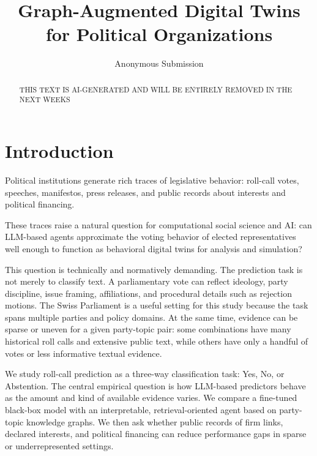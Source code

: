 \documentclass[letterpaper]{article}
\title{Graph-Augmented Digital Twins for Political Organizations}
\author{Anonymous Submission}
\begin{document}
\maketitle

\begin{abstract}

THIS TEXT IS AI-GENERATED AND WILL BE ENTIRELY  REMOVED IN THE NEXT WEEKS

\end{abstract}

\clearpage

\section{Introduction}

Political institutions generate rich traces of legislative behavior: roll-call votes, speeches, manifestos, press releases,
and public records about interests and political financing.

These traces raise a natural question for computational social science and AI: can LLM-based agents approximate the voting behavior of elected representatives well enough to
function as behavioral digital twins for analysis and simulation?

This question is technically and normatively demanding. The prediction task is not merely to classify text. A parliamentary vote can reflect ideology, party discipline, issue
framing, affiliations, and procedural details such as rejection motions. The Swiss Parliament is a useful setting for this study because the task spans multiple parties and policy domains. At the same time, evidence can be sparse or uneven for a given party-topic pair: some combinations have many historical roll calls and extensive public text, while others have only a handful of votes or less informative textual evidence.

We study roll-call prediction as a three-way classification task: Yes, No, or Abstention. The central empirical question is how LLM-based predictors behave as the amount and
kind of available evidence varies. We compare a fine-tuned
black-box model with an interpretable, retrieval-oriented
agent based on party-topic knowledge graphs. We then ask
whether public records of firm links, declared interests, and
political financing can reduce performance gaps in sparse or
underrepresented settings.
\end{document}
